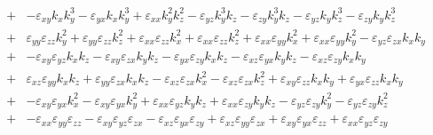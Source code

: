 \documentclass[12pt,a4paper,twoside,openright,BCOR10mm,headsepline,titlepage,abstracton,chapterprefix,final]{scrreprt}
\newcommand\wavenumber{k}
\newcommand\scalarpermittivity{\varepsilon}
\begin{document}
\begin{eqnarray}
 \nonumber\\&+&
    - \scalarpermittivity_{xy} \wavenumber_x \wavenumber_y^3 - \scalarpermittivity_{yx} \wavenumber_x \wavenumber_y^3 
    +  \scalarpermittivity_{xx} \wavenumber_y^2 \wavenumber_z^2  
    - \scalarpermittivity_{yz} \wavenumber_y^3 \wavenumber_z - \scalarpermittivity_{zy} \wavenumber_y^3 \wavenumber_z  
    - \scalarpermittivity_{yz} \wavenumber_y \wavenumber_z^3 - \scalarpermittivity_{zy} \wavenumber_y \wavenumber_z^3  
 \nonumber\\[2ex]
 &+& 
       \scalarpermittivity_{yy} \scalarpermittivity_{zz} \wavenumber_y^2 
    +  \scalarpermittivity_{yy} \scalarpermittivity_{zz} \wavenumber_z^2 
    +  \scalarpermittivity_{xx} \scalarpermittivity_{zz} \wavenumber_x^2 + \scalarpermittivity_{xx} \scalarpermittivity_{zz} \wavenumber_z^2 + \scalarpermittivity_{xx} \scalarpermittivity_{yy} \wavenumber_x^2 + \scalarpermittivity_{xx} \scalarpermittivity_{yy} \wavenumber_y^2 
    -  \scalarpermittivity_{yz} \scalarpermittivity_{zx} \wavenumber_x \wavenumber_y 
 \nonumber\\&+&
    -  \scalarpermittivity_{xy} \scalarpermittivity_{yz} \wavenumber_x \wavenumber_z - \scalarpermittivity_{xy} \scalarpermittivity_{zx} \wavenumber_y \wavenumber_z  
    -  \scalarpermittivity_{yx} \scalarpermittivity_{zy} \wavenumber_x \wavenumber_z  
    -  \scalarpermittivity_{xz} \scalarpermittivity_{yx} \wavenumber_y \wavenumber_z - \scalarpermittivity_{xz} \scalarpermittivity_{zy} \wavenumber_x \wavenumber_y  
 \nonumber\\&+&
       \scalarpermittivity_{xz} \scalarpermittivity_{yy} \wavenumber_x \wavenumber_z + \scalarpermittivity_{yy} \scalarpermittivity_{zx} \wavenumber_x \wavenumber_z 
    -  \scalarpermittivity_{xz} \scalarpermittivity_{zx} \wavenumber_x^2 
    -  \scalarpermittivity_{xz} \scalarpermittivity_{zx} \wavenumber_z^2 
    +  \scalarpermittivity_{xy} \scalarpermittivity_{zz} \wavenumber_x \wavenumber_y + \scalarpermittivity_{yx} \scalarpermittivity_{zz} \wavenumber_x \wavenumber_y 
 \nonumber\\&+&
    -  \scalarpermittivity_{xy} \scalarpermittivity_{yx} \wavenumber_x^2 
    -  \scalarpermittivity_{xy} \scalarpermittivity_{yx} \wavenumber_y^2 
    +  \scalarpermittivity_{xx} \scalarpermittivity_{yz} \wavenumber_y \wavenumber_z + \scalarpermittivity_{xx} \scalarpermittivity_{zy} \wavenumber_y \wavenumber_z  
    -  \scalarpermittivity_{yz} \scalarpermittivity_{zy} \wavenumber_y^2 
    -  \scalarpermittivity_{yz} \scalarpermittivity_{zy} \wavenumber_z^2 
 \nonumber\\[2ex]
 &+& 
 -  \scalarpermittivity_{xx} \scalarpermittivity_{yy} \scalarpermittivity_{zz} 
 -  \scalarpermittivity_{xy} \scalarpermittivity_{yz} \scalarpermittivity_{zx}  
 -  \scalarpermittivity_{xz} \scalarpermittivity_{yx} \scalarpermittivity_{zy} 
 +  \scalarpermittivity_{xz} \scalarpermittivity_{yy} \scalarpermittivity_{zx} 
 +  \scalarpermittivity_{xy} \scalarpermittivity_{yx} \scalarpermittivity_{zz} 
 +  \scalarpermittivity_{xx} \scalarpermittivity_{yz} \scalarpermittivity_{zy} 
\end{eqnarray}
\end{document}

